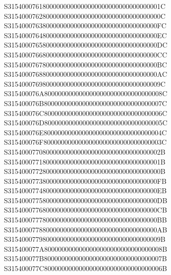 \documentclass[12pt,a4paper]{article}
\begin{document}
\begin{framed}
{S31540007618000000000000000000000000000000001C\newline
S31540007628000000000000000000000000000000000C\newline
S3154000763800000000000000000000000000000000FC\newline
S3154000764800000000000000000000000000000000EC\newline
S3154000765800000000000000000000000000000000DC\newline
S3154000766800000000000000000000000000000000CC\newline
S3154000767800000000000000000000000000000000BC\newline
S3154000768800000000000000000000000000000000AC\newline
S31540007698000000000000000000000000000000009C\newline
S315400076A8000000000000000000000000000000008C\newline
S315400076B8000000000000000000000000000000007C\newline
S315400076C8000000000000000000000000000000006C\newline
S315400076D8000000000000000000000000000000005C\newline
S315400076E8000000000000000000000000000000004C\newline
S315400076F8000000000000000000000000000000003C\newline
S31540007708000000000000000000000000000000002B\newline
S31540007718000000000000000000000000000000001B\newline
S31540007728000000000000000000000000000000000B\newline
S3154000773800000000000000000000000000000000FB\newline
S3154000774800000000000000000000000000000000EB\newline
S3154000775800000000000000000000000000000000DB\newline
S3154000776800000000000000000000000000000000CB\newline
S3154000777800000000000000000000000000000000BB\newline
S3154000778800000000000000000000000000000000AB\newline
S31540007798000000000000000000000000000000009B\newline
S315400077A8000000000000000000000000000000008B\newline
S315400077B8000000000000000000000000000000007B\newline
S315400077C8000000000000000000000000000000006B\newline
}
\end{framed}
\end{document}
